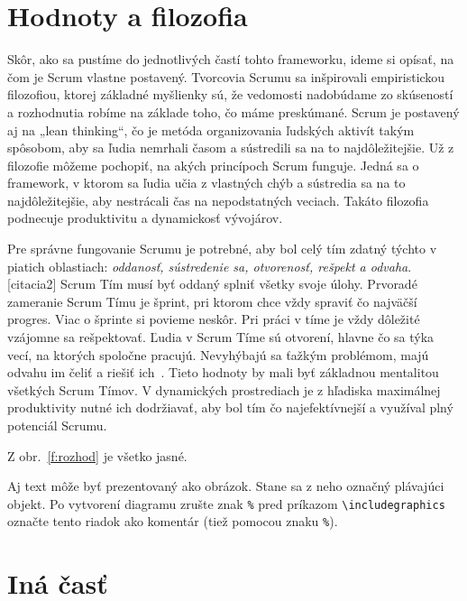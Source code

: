\documentclass[10pt,twoside,slovak,a4paper]{article}
\begin{document}
\section{Hodnoty a filozofia} \label{hodnoty}

Skôr, ako sa pustíme do jednotlivých častí tohto frameworku, ideme si opísať, na čom je Scrum vlastne postavený. Tvorcovia Scrumu sa inšpirovali empiristickou filozofiou, ktorej základné myšlienky sú, že vedomosti nadobúdame zo skúseností a rozhodnutia robíme na základe toho, čo máme preskúmané. Scrum je postavený aj na „lean thinking“, čo je metóda organizovania ľudských aktivít takým spôsobom, aby sa ľudia nemrhali časom a sústredili sa na to najdôležitejšie. Už z filozofie môžeme pochopiť, na akých princípoch Scrum funguje. Jedná sa o framework, v ktorom sa ľudia učia z vlastných chýb a sústredia sa na to najdôležitejšie, aby nestrácali čas na nepodstatných veciach. Takáto filozofia podnecuje produktivitu a dynamickosť vývojárov.

Pre správne fungovanie Scrumu je potrebné, aby bol celý tím zdatný týchto v piatich oblastiach: \emph{oddanosť, sústredenie sa, otvorenosť, rešpekt a odvaha}. [citacia2] Scrum Tím musí byť oddaný splniť všetky svoje úlohy. Prvoradé zameranie Scrum Tímu je šprint, pri ktorom chce vždy spraviť čo najväčší progres. Viac o šprinte si povieme neskôr. Pri práci v tíme je vždy dôležité vzájomne sa rešpektovať. Ľudia v Scrum Tíme sú otvorení, hlavne čo sa týka vecí, na ktorých spoločne pracujú. Nevyhýbajú sa ťažkým problémom, majú odvahu im čeliť a riešiť ich~\cite{}. Tieto hodnoty by mali byť základnou mentalitou všetkých Scrum Tímov. V dynamických prostrediach je z hľadiska maximálnej produktivity nutné ich dodržiavať, aby bol tím čo najefektívnejší a využíval plný potenciál Scrumu. 


Z obr.~\ref{f:rozhod} je všetko jasné. 

\begin{figure*}[tbh]
\centering
Aj text môže byť prezentovaný ako obrázok. Stane sa z neho označný plávajúci objekt. Po vytvorení diagramu zrušte znak \texttt{\%} pred príkazom \verb|\includegraphics| označte tento riadok ako komentár (tiež pomocou znaku \texttt{\%}).
\caption{Rozhodujúci argument.}
\label{f:rozhod}
\end{figure*}



\section{Iná časť} \label{ina}
\end{document}

